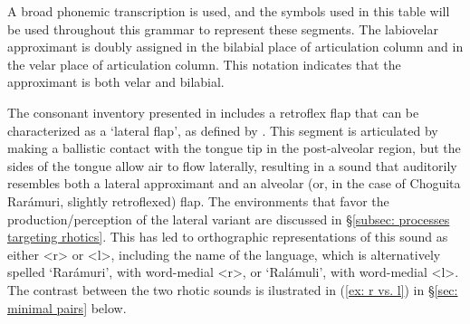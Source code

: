 \begin{table}
\caption{{Phonemic inventory of Choguita Raramuri consonants}}
\label{tab:consonants-phonology}
\end{table}

A broad phonemic transcription is used, and the symbols used in this table will be used throughout this grammar to represent these segments. The labiovelar approximant is doubly assigned in the bilabial place of articulation column and in the velar place of articulation column. This notation indicates that the approximant is both velar and bilabial.

\largerpage
The consonant inventory presented in  includes a retroflex flap that can be characterized as a `lateral flap', as defined by \citep[][234]{ladefoged1996sounds}. This segment is articulated by making a ballistic contact with the tongue tip in the post-alveolar region, but the sides of the tongue allow air to flow laterally, resulting in a sound that auditorily resembles both a lateral approximant and an alveolar (or, in the case of Choguita Rarámuri, slightly retroflexed) flap. The environments that favor the production/perception of the lateral variant are discussed in §\ref{subsec: processes targeting rhotics}. This has led to orthographic representations of this sound as either <r> or <l>, including the name of the language, which is alternatively spelled `Rarámuri', with word-medial <r>, or `Ralámuli', with word-medial <l>. The contrast between the two rhotic sounds is ilustrated in (\ref{ex: r vs. l}) in §\ref{sec: minimal pairs} below.

